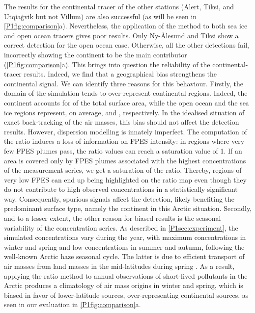         The results for the continental tracer of the other stations (Alert, Tiksi, and Utqiaġvik but not Villum) are also successful (as will be seen in \cref{P1fig:comparison}a).
        Nevertheless, the application of the method to both sea ice and open ocean tracers gives poor results.
        Only Ny-Ålesund and Tiksi show a correct detection for the open ocean case. Otherwise, all the other detections fail,  incorrectly showing the continent to be the main contributor (\cref{P1fig:comparison}a).
        This brings into question the reliability of the continental-tracer results.
        Indeed, we find that a geographical bias strengthens the continental signal.
        We can identify three reasons for this behaviour.
        Firstly, the domain of the simulation tends to over-represent continental regions. Indeed, the continent accounts for  of the total surface area, while the open ocean and the sea ice regions represent, on average,  and , respectively.
        In the idealised situation of exact back-tracking of the air masses, this bias should not affect the detection results. However, dispersion modelling is innately imperfect.
        The computation of the ratio induces a loss of information on FPES intensity: in regions where very few FPES plumes pass, the ratio values can reach a saturation value of 1.
        If an area is covered only by FPES plumes associated with the highest concentrations of the measurement series, we get a saturation of the ratio.
        Thereby, regions of very low FPES can end up being highlighted on the ratio map even though they do not contribute to high observed concentrations in a statistically significant way.
        Consequently, spurious signals affect the detection, likely benefiting the predominant surface type, namely the continent in this Arctic situation.
        Secondly, and to a lesser extent, the other reason for biased results is the seasonal variability of the concentration series.
        As described in \cref{P1sec:experiment}, the simulated concentrations vary during the year, with maximum concentrations in winter and spring and low concentrations in summer and autumn, following the well-known Arctic haze seasonal cycle.
        The latter is due to efficient transport of air masses from land masses in the mid-latitudes during spring  \citep{schmale_pan-arctic_2022}.
        As a result, applying the ratio method to annual observations of short-lived pollutants in the Arctic produces a climatology of air mass origins in winter and spring, which is biased in favor of lower-latitude sources, over-representing continental sources, as seen in our evaluation in \cref{P1fig:comparison}a.
